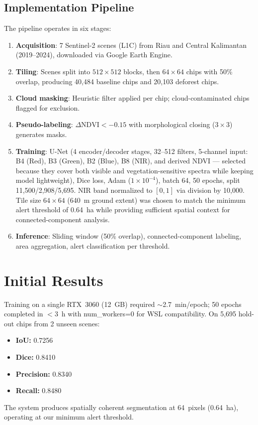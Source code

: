 \documentclass[10pt,a4paper,twocolumn]{article}
\begin{document}
\subsection{Implementation Pipeline}
The pipeline operates in six stages:
\begin{enumerate}[nosep,itemsep=1pt]
    \item \textbf{Acquisition}: 7 Sentinel-2 scenes (L1C) from
          Riau and Central Kalimantan (2019--2024), downloaded
          via Google Earth Engine.
    \item \textbf{Tiling}: Scenes split into $512\times512$ blocks,
          then $64\times64$ chips with 50\% overlap, producing
          40,484 baseline chips and 20,103 deforest chips.
    \item \textbf{Cloud masking}: Heuristic filter applied per
          chip; cloud-contaminated chips flagged for exclusion.
    \item \textbf{Pseudo-labeling}: $\Delta\text{NDVI}<-0.15$ with
          morphological closing ($3\times3$) generates masks.
    \item \textbf{Training}: U-Net (4 encoder/decoder stages,
          32--512 filters, 5-channel input: B4 (Red), B3 (Green),
          B2 (Blue), B8 (NIR), and derived NDVI --- selected
          because they cover both visible and vegetation-sensitive
          spectra while keeping model lightweight), Dice loss,
          Adam ($1\times10^{-4}$), batch 64, 50 epochs, split
          11,500/2,908/5,695. NIR band normalized to $[0,1]$
          via division by 10,000. Tile size $64\times64$ (640~m
          ground extent) was chosen to match the minimum alert
          threshold of 0.64~ha while providing sufficient spatial
          context for connected-component analysis.
    \item \textbf{Inference}: Sliding window (50\% overlap),
          connected-component labeling, area aggregation, alert
          classification per threshold.
\end{enumerate}

\section{Initial Results}
Training on a single RTX~3060 (12~GB) required $\sim$2.7~min/epoch;
50 epochs completed in ${<}$3~h with num\_workers=0 for WSL
compatibility. On 5,695 hold-out chips from 2 unseen scenes:
\begin{itemize}[nosep]
    \item \textbf{IoU:} 0.7256
    \item \textbf{Dice:} 0.8410
    \item \textbf{Precision:} 0.8340
    \item \textbf{Recall:} 0.8480
\end{itemize}
The system produces spatially coherent segmentation at 64~pixels
(0.64~ha), operating at our minimum alert threshold.
\end{document}
